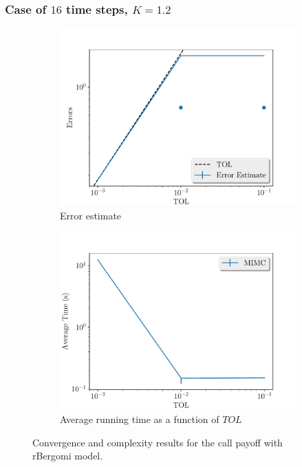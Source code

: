 \documentclass[11pt]{article}
\begin{document}
\newpage

\subsubsection*{Case of $16$ time steps, $K=1.2$}
\begin{figure}[!h]
	\centering
	\begin{subfigure}{.5\textwidth}
		\centering
		\includegraphics[width=1\linewidth]{./figures/rbergomi_16_steps_K_1_2/error_estimate.pdf}
		\caption{Error estimate}
		\label{fig:misc_rbergomi_16_steps_K_1_2_sub1}
	\end{subfigure}%
	\begin{subfigure}{.5\textwidth}
		\centering
		\includegraphics[width=1\linewidth]{./figures/rbergomi_16_steps_K_1_2/average_running_time.pdf}
		\caption{Average running time as a function of $TOL$}
		\label{fig:misc_rbergomi_16_steps_K_1_2_sub2}
	\end{subfigure}%
	\caption{Convergence and complexity results for the call payoff with rBergomi model.}
	\label{fig:misc_rbergomi_16_steps_K_1_2_1}
\end{figure}
\end{document}
